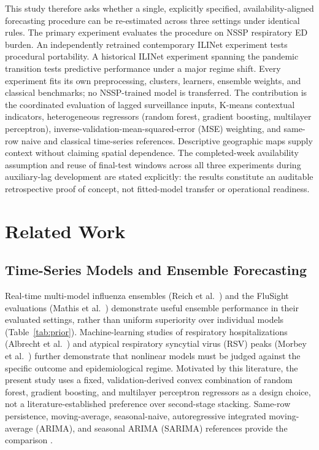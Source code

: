 \documentclass[conference,a4paper]{IEEEtran}
\begin{document}
This study therefore asks whether a single, explicitly specified, availability-aligned forecasting procedure can be re-estimated across three settings under identical rules. The primary experiment evaluates the procedure on NSSP respiratory ED burden. An independently retrained contemporary ILINet experiment tests procedural portability. A historical ILINet experiment spanning the pandemic transition tests predictive performance under a major regime shift. Every experiment fits its own preprocessing, clusters, learners, ensemble weights, and classical benchmarks; no NSSP-trained model is transferred. The contribution is the coordinated evaluation of lagged surveillance inputs, K-means contextual indicators, heterogeneous regressors (random forest, gradient boosting, multilayer perceptron), inverse-validation-mean-squared-error (MSE) weighting, and same-row naive and classical time-series references. Descriptive geographic maps supply context without claiming spatial dependence. The completed-week availability assumption and reuse of final-test windows across all three experiments during auxiliary-lag development are stated explicitly: the results constitute an auditable retrospective proof of concept, not fitted-model transfer or operational readiness.

\section{Related Work}
\subsection{Time-Series Models and Ensemble Forecasting}
Real-time multi-model influenza ensembles (Reich et al.\ \cite{reich}) and the FluSight evaluations (Mathis et al.\ \cite{mathis}) demonstrate useful ensemble performance in their evaluated settings, rather than uniform superiority over individual models (Table~\ref{tab:prior}). Machine-learning studies of respiratory hospitalizations (Albrecht et al.\ \cite{albrecht}) and atypical respiratory syncytial virus (RSV) peaks (Morbey et al.\ \cite{morbey}) further demonstrate that nonlinear models must be judged against the specific outcome and epidemiological regime. Motivated by this literature, the present study uses a fixed, validation-derived convex combination of random forest, gradient boosting, and multilayer perceptron regressors as a design choice, not a literature-established preference over second-stage stacking. Same-row persistence, moving-average, seasonal-naive, autoregressive integrated moving-average (ARIMA), and seasonal ARIMA (SARIMA) references provide the comparison \cite{hyndman,box}.
\end{document}

